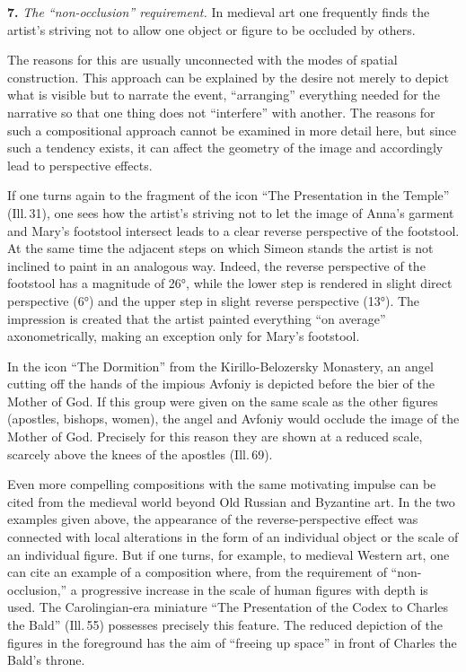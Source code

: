 \medskip
\noindent\textbf{7.}\quad
\emph{The ``non-occlusion'' requirement.}  In medieval art one frequently finds the
artist's striving not to allow one object or figure to be occluded by others.


The reasons for this are usually unconnected with the modes of spatial construction.
This approach can be explained by the desire not merely to depict what is visible but
to narrate the event, ``arranging'' everything needed for the narrative so that one
thing does not ``interfere'' with another.  The reasons for such a compositional
approach cannot be examined in more detail here, but since such a tendency exists, it
can affect the geometry of the image and accordingly lead to perspective effects.

If one turns again to the fragment of the icon ``The Presentation in the Temple''
(Ill.\,31), one sees how the artist's striving not to let the image of Anna's garment
and Mary's footstool intersect leads to a clear reverse perspective of the footstool.
At the same time the adjacent steps on which Simeon stands the artist is not inclined
to paint in an analogous way.  Indeed, the reverse perspective of the footstool has a
magnitude of 26°, while the lower step is rendered in slight direct perspective (6°)
and the upper step in slight reverse perspective (13°).  The impression is created
that the artist painted everything ``on average'' axonometrically, making an exception
only for Mary's footstool.

In the icon ``The Dormition'' from the Kirillo-Belozersky Monastery, an angel cutting
off the hands of the impious Avfoniy is depicted before the bier of the Mother of
God.  If this group were given on the same scale as the other figures (apostles,
bishops, women), the angel and Avfoniy would occlude the image of the Mother of God.
Precisely for this reason they are shown at a reduced scale, scarcely above the knees
of the apostles (Ill.\,69).

Even more compelling compositions with the same motivating impulse can be cited from
the medieval world beyond Old Russian and Byzantine art.  In the two examples given
above, the appearance of the reverse-perspective effect was connected with local
alterations in the form of an individual object or the scale of an individual figure.
But if one turns, for example, to medieval Western art, one can cite an example of a
composition where, from the requirement of ``non-occlusion,'' a progressive increase
in the scale of human figures with depth is used.  The Carolingian-era miniature
``The Presentation of the Codex to Charles the Bald'' (Ill.\,55) possesses precisely
this feature.  The reduced depiction of the figures in the foreground has the aim of
``freeing up space'' in front of Charles the Bald's throne.

